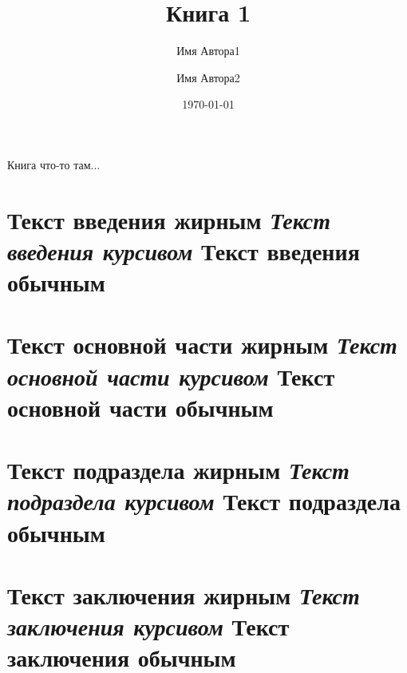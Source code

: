 \documentclass[14pt]{book}
\title{Книга 1}
\author{Имя Автора1 \and Имя Автора2}
\date{\today}
\begin{document}
\maketitle

\begin{center}
    {\huge Книга что-то там...}
\end{center}

\renewcommand{\contentsname}{Содержание}
\tableofcontents
\thispagestyle{empty}

\chapter[Введение]{
\tiny{\textbf{Текст введения жирным} \textit{Текст введения курсивом} Текст введения обычным}
}

\chapter[Основная часть]{
\large{\textbf{Текст основной части жирным} \textit{Текст основной части курсивом} Текст основной части обычным}
}

\chapter[Подраздел]{
\large{\textbf{Текст подраздела жирным} \textit{Текст подраздела курсивом} Текст подраздела обычным}
}

\chapter[Заключение]{
\huge{\textbf{Текст заключения жирным} \textit{Текст заключения курсивом} Текст заключения обычным}
}
\end{document}
